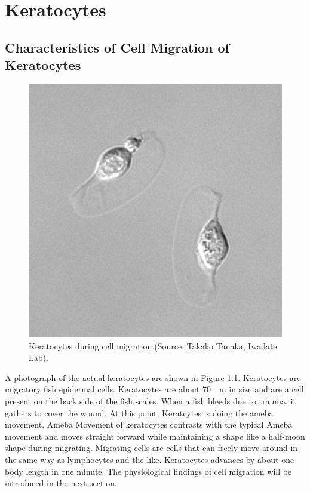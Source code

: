 \documentclass[a4paper,12pt]{book}
\begin{document}
\chapter{Keratocytes}
\section{Characteristics of Cell Migration of Keratocytes}
\begin{figure}[tbp]
\centering
\includegraphics[scale=0.4]{kera.eps}
\caption{Keratocytes during cell migration.(Source: Takako Tanaka, Iwadate Lab).}
\label{fig:kera}
\end{figure}

A photograph of the actual keratocytes are shown in Figure \ref{fig:kera}. Keratocytes are migratory fish epidermal cells. 
Keratocytes are about \SI{70}{\mu m} in size and are a cell present on the back side of the fish scales.
When a fish bleeds due to trauma, it gathers to cover the wound. At this point, Keratcytes is doing the ameba movement.
Ameba Movement of keratocytes  contrasts with the typical Ameba movement and moves straight forward while maintaining a shape like a half-moon shape during migrating.
Migrating cells are cells that can freely move around in the same way as lymphocytes and the like. Keratocytes advances by about one body length in one minute. The physiological findings of cell migration will be introduced in the next section.
\end{document}
